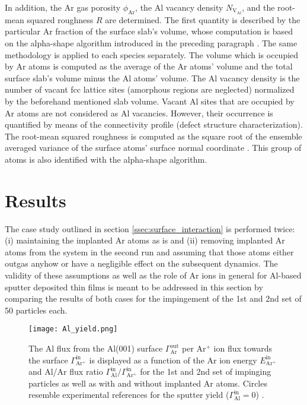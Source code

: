 \documentclass[12pt,a4paper,preprint,superscriptaddress]{revtex4-1}
\begin{document}
In addition, the Ar gas porosity $\phi_\mathrm{Ar}$, the Al vacancy density $N_\mathrm{V_{Al}}$,  and the root-mean squared roughness $R$ are determined. The first quantity is described by the particular Ar fraction of the surface slab's volume, whose computation is based on the alpha-shape algorithm introduced in the preceding paragraph \citep{stukowski2009visualization,stukowski2014computational}. The same methodology is applied to each species separately. The volume which is occupied by Ar atoms is computed as the average of 
the Ar atoms' volume and the total surface slab's volume minus the Al atoms' volume. The Al vacancy density is the number of vacant fcc lattice sites (amorphous regions are neglected) normalized by the beforehand mentioned slab volume. Vacant Al sites that are occupied by Ar atoms are not considered as Al vacancies. However, their occurrence is quantified by means of the connectivity profile (defect structure characterization). The root-mean squared roughness is computed as the square root of the ensemble averaged variance of the surface atoms' surface normal coordinate \citep{lou2004feedback}. This group of atoms is also identified with the alpha-shape algorithm.

\section{Results}
\label{sec:results}

The case study outlined in section \ref{ssec:surface_interaction} is performed twice: (i) maintaining the implanted Ar atoms as is and (ii) removing implanted Ar atoms from the system in the second run and assuming that those atoms either outgas anyhow or have a negligible effect on the subsequent dynamics. The validity of these assumptions as well as the role of Ar ions in general for Al-based sputter deposited thin films is meant to be addressed in this section by comparing the results of both cases for the impingement of the 1st and 2nd set of 50 particles each.

\begin{figure}[t]
\texttt{[image: Al\_yield.png]}
\caption{The Al flux from the Al(001) surface $\Gamma_\mathrm{Ar}^\mathrm{out}$ per Ar$^+$ ion flux towards the surface $\Gamma_\mathrm{Ar^+}^\mathrm{in}$ is displayed as a function of the Ar ion energy $E_\mathrm{Ar^+}^\mathrm{in}$ and Al/Ar flux ratio $\Gamma_\mathrm{Al}^\mathrm{in}/\Gamma_\mathrm{Ar^+}^\mathrm{in}$ for the 1st and 2nd set of impinging particles as well as with and without implanted Ar atoms. Circles resemble experimental references for the sputter yield ($\Gamma_\mathrm{Al}^\mathrm{in}=0$) \citep{laegreid1961sputtering}.}
\label{fig:yield}
\end{figure}
\end{document}
